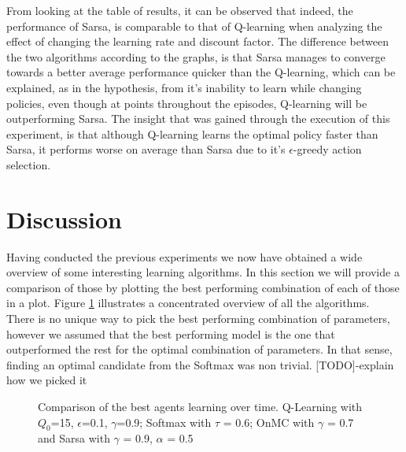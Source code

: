 \documentclass[11pt]{article}
\begin{document}
From looking at the table of results, it can be observed that indeed, the performance of Sarsa, is comparable to that of Q-learning when analyzing the effect of changing the learning rate and discount factor. The difference between the two algorithms according to the graphs, is that Sarsa manages to converge towards a better average performance quicker than the Q-learning, which can be explained, as in the hypothesis, from it's inability to learn while changing policies, even though at points throughout the episodes, Q-learning will be outperforming Sarsa.
The insight that was gained through the execution of this experiment, is that although Q-learning learns the optimal policy faster than Sarsa, it performs worse on average than Sarsa due to it's $\epsilon$-greedy action selection.


\section{Discussion}
Having conducted the previous experiments we now have obtained a wide overview of some interesting learning algorithms. In this section we will provide a comparison of those by plotting the best performing combination of each of those in a plot. Figure \ref{discussion} illustrates a concentrated overview of all the algorithms.\\
There is no unique way to pick the best performing combination of parameters, however we assumed that the best performing model is the one that outperformed the rest for the optimal combination of parameters. In that sense, finding an optimal candidate from the Softmax was non trivial. [TODO]-explain how we picked it

\begin{center}
\begin{figure}
\caption{Comparison of the best agents learning over time. Q-Learning with $Q_0$=15, $\epsilon$=0.1, $\gamma$=0.9; Softmax with $\tau$ = 0.6; OnMC with $\gamma$ = 0.7 and Sarsa with $\gamma$ = 0.9, $\alpha$ = 0.5}
\label{discussion}
\end{figure}
\end{center}
\end{document}
